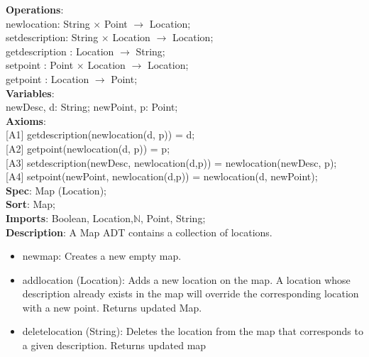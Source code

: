 \documentclass[12pt]{article}
\begin{document}
\begin{spacing}{1.5}
\noindent \textbf{Operations}:\\
\hspace*{5mm} newlocation: String $\times$ Point $\rightarrow$ Location;\\
\hspace*{5mm} setdescription: String $\times$ Location $\rightarrow$ Location;\\
\hspace*{5mm} getdescription : Location $\rightarrow$ String;\\
\hspace*{5mm} setpoint : Point $\times$ Location $\rightarrow$ Location;\\
\hspace*{5mm} getpoint : Location $\rightarrow$ Point;\\
\noindent \textbf{Variables}:\\
\hspace*{5mm} newDesc, d: String; newPoint, p: Point;\\
\noindent \textbf{Axioms}:\\
\hspace*{5mm} [A1] getdescription(newlocation(d, p)) = d;\\
\hspace*{5mm} [A2] getpoint(newlocation(d, p)) = p;\\
\hspace*{5mm} [A3] setdescription(newDesc, newlocation(d,p)) = newlocation(newDesc, p);\\
\hspace*{5mm} [A4] setpoint(newPoint, newlocation(d,p)) = newlocation(d, newPoint);\\
\newpage
\noindent \textbf{Spec}: Map (Location);\\
\noindent \textbf{Sort}: Map;\\
\noindent \textbf{Imports}: Boolean, Location,$\mathbb{N}$, Point, String;\\
\noindent \textbf{Description}: A Map ADT contains a collection of locations.
\begin{itemize}
	\item newmap: Creates a new empty map.
	\item addlocation (Location): Adds a new location on the map. A location whose description already exists in the map will override the corresponding location with a new
	point.
Returns updated Map.
	\item deletelocation (String): Deletes the location from the map that corresponds to
	a given description. Returns updated map


\end{itemize}
\end{spacing}
\end{document}
